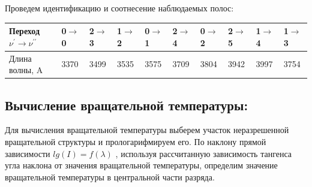 Проведем идентификацию и соотнесение наблюдаемых полос:

\begin{table}[h!]
	\begin{tabular}{|l|l|l|l|l|l|l|l|l|l|}
		\hline
		Переход $\nu^{\prime}  \rightarrow \nu^{\prime \prime}  $    & 0$\rightarrow$0  & 2$\rightarrow$3  & 1$\rightarrow$2  & 0$\rightarrow$1  & 2$\rightarrow$4  & 0$\rightarrow$2  & 2$\rightarrow$5  & 1$\rightarrow$4  & 1$\rightarrow$3  \\ \hline
		Длина волны, A & 3370 & 3499 & 3535 & 3575 & 3709 & 3804 & 3942 & 3997 & 3754 \\ \hline
	\end{tabular}
\end{table}

\newpage

\subsection{Вычисление вращательной температуры:}

Для вычисления вращательной температуры выберем участок неразрешенной вращательной
структуры и прологарифмируем его. По наклону прямой зависимости $lg(I) = f(\lambda)$ , используя
рассчитанную зависимость тангенса угла наклона от значения вращательной температуры, определим значение вращательной температуры в центральной части разряда.

\begin{figure}[h!]
	\label{fig:image}
\end{figure}

\begin{figure}[h!]
	\label{fig:image}
\end{figure}

